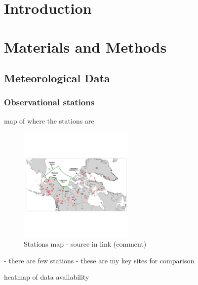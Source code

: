 \documentclass[draft]{agujournal2019}
\begin{document}
\section{Introduction}

\section{Materials and Methods}

\subsection{Meteorological Data}
\subsubsection{Observational stations}
map of where the stations are 

\begin{figure}[h!tbp]
\noindent\includegraphics[width=0.5\textwidth]{figures/weather_stations.png}
\caption{Stations map - source in link (comment)}
\end{figure}

- there are few stations
- these are my key sites for comparison

heatmap of data availability 
\end{document}
